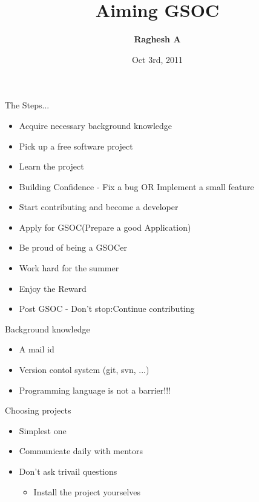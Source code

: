 \documentclass{beamer}
\title{Aiming GSOC}
\author{\textbf{Raghesh A}}
\date{Oct 3rd, 2011}
\begin{document}
\begin{frame}
\titlepage
\end{frame}

\begin{frame}{The Steps...}
\begin{itemize}
\item Acquire necessary background knowledge
\item Pick up a free software project
\item Learn the project
\item Building Confidence - Fix a bug OR Implement a small feature
\item Start contributing and become a developer
\item Apply for GSOC(Prepare a good Application)
\item Be proud of being a GSOCer
\item Work hard for the summer
\item Enjoy the Reward
\item Post GSOC - Don't stop:Continue contributing
\end{itemize}
\end{frame}

\begin{frame}{Background knowledge}
\begin{itemize}
\item A mail id
\item Version contol system (git, svn, ...)
\item Programming language is not a barrier!!!
\end{itemize}
\end{frame}

\begin{frame}{Choosing projects}
\begin{itemize}
\begin{block}
{Starting to contribute to a project earlier is the natural way to enter GSOC.
In that sense this is a long term commitment}
\end{block}
\item Simplest one
\item Communicate daily with mentors
\item Don't ask trivail questions
  \begin{itemize}
  \item Install the project yourselves
  \end{itemize}
\end{itemize}
\end{frame}
\end{document}
